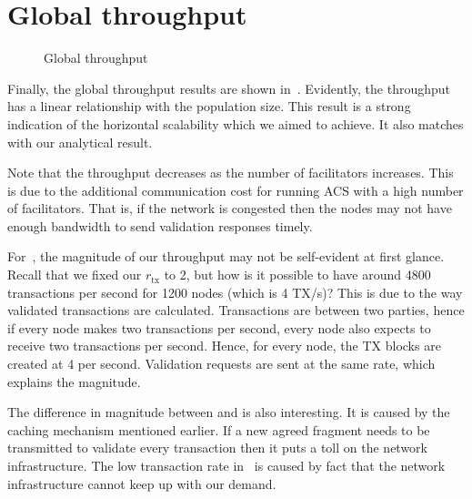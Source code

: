 \section{Global throughput}
\begin{figure}[h]
  \centering
  \caption{Global throughput}
  \label{fig:global-throughput}
\end{figure}


Finally, the global throughput results are shown in~.
Evidently, the throughput has a linear relationship with the population size.
This result is a strong indication of the horizontal scalability which we aimed to achieve.
It also matches with our analytical result.

Note that the throughput decreases as the number of facilitators increases.
This is due to the additional communication cost for running ACS with a high number of facilitators.
That is, if the network is congested then the nodes may not have enough bandwidth to send validation responses timely.

For~,
the magnitude of our throughput may not be self-evident at first glance.
Recall that we fixed our $r_\text{tx}$ to 2, but how is it possible to have around 4800 transactions per second for 1200 nodes (which is 4 TX/s)?
This is due to the way validated transactions are calculated.
Transactions are between two parties, hence if every node makes two transactions per second,
every node also expects to receive two transactions per second.
Hence, for every node, the TX blocks are created at 4 per second.
Validation requests are sent at the same rate, which explains the magnitude.

The difference in magnitude between  and  is also interesting.
It is caused by the caching mechanism mentioned earlier.
If a new agreed fragment needs to be transmitted to validate every transaction then it puts a toll on the network infrastructure.
The low transaction rate in~ is caused by fact that the network infrastructure cannot keep up with our demand.

